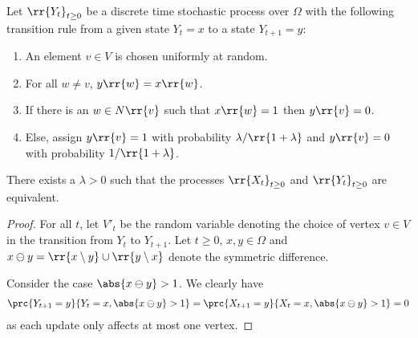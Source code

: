 \documentclass{article}
\begin{document}
\begin{claim*}[1]
  Let $\rr{Y_t}_{t\geq 0}$ be a discrete time stochastic process over $\Omega$ with the
  following transition rule from a given state $Y_t=x$ to a state $Y_{t+1}=y$:
  \begin{enumerate}
    \item An element $v\in V$ is chosen uniformly at random.
    \item For all $w\neq v$, $y\rr{w}=x\rr{w}$.
    \item If there is an $w\in N\rr{v}$ such that $x\rr{w}=1$ then $y\rr{v}=0$.
    \item Else, assign $y\rr{v}=1$ with probability $\lambda/\rr{1+\lambda}$ and $y\rr{v}=0$
      with probability $1/\rr{1+\lambda}$.
  \end{enumerate}
  There exists a $\lambda>0$ such that
  the processes $\rr{X_t}_{t\geq 0}$ and $\rr{Y_t}_{t\geq 0}$ are equivalent.
  \begin{proof}
    For all $t$, let $V'_t$ be the random variable denoting the choice of vertex $v\in V$ in the
    transition from $Y_t$ to $Y_{t+1}$.
    Let $t\geq 0$, $x,y\in\Omega$ and $x\ominus y=\rr{x\setminus y}\cup\rr{y\setminus x}$
    denote the symmetric difference.

    Consider the case $\abs{x\ominus y}>1$. We clearly have
    \begin{align*}
      \prc{Y_{t+1}=y}{Y_t=x, \abs{x\ominus y}>1} = \prc{X_{t+1}=y}{X_t=x, \abs{x\ominus y}>1} = 0
    \end{align*}
    as each update only affects at most one vertex.


\end{proof}
\end{claim*}
\end{document}
